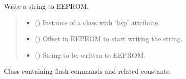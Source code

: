 \documentclass[letterpaper,10pt,english]{sphinxmanual}
\begin{document}
\begin{fulllineitems}
\label{\detokenize{cplddocs:config_ip.write_string}}
\pysigstartsignatures
{}
\pysigstopsignatures
\sphinxAtStartPar
Write a string to EEPROM.
\begin{quote}\begin{description}
\begin{itemize}
\item {} 
\sphinxAtStartPar
{} () \textendash{} Instance of a class with ‘bsp’ attribute.

\item {} 
\sphinxAtStartPar
{} () \textendash{} Offset in EEPROM to start writing the string.

\item {} 
\sphinxAtStartPar
{} () \textendash{} String to be written to EEPROM.

\end{itemize}

\end{description}\end{quote}

\end{fulllineitems}

\label{\detokenize{cplddocs:module-cpld2mcu_serial_ctrl_2}}

\begin{fulllineitems}
\label{\detokenize{cplddocs:cpld2mcu_serial_ctrl_2.FlashCmd}}
\pysigstartsignatures
{}
\pysigstopsignatures
\sphinxAtStartPar
Class containing flash commands and related constants.

\end{fulllineitems}
\end{document}
